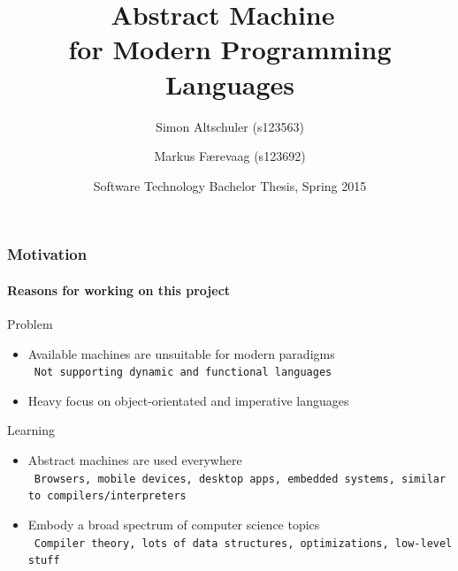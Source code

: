 \documentclass[handout]{beamer}
\title{Abstract Machine~\\for Modern Programming Languages}
\author[Altschuler, Færevaag]{Simon Altschuler (s123563) \and Markus Færevaag (s123692)}
\date{Software Technology Bachelor Thesis, Spring 2015}
\newcommand{\n}[1]{\leavevmode\\~\texttt{\color{red}\tiny #1}}
\begin{document}
\frame{\titlepage}

\begin{frame}
  \frametitle{Motivation}
  \framesubtitle{Reasons for working on this project}

  Problem
  \begin{itemize}
  \item Available machines are unsuitable for modern paradigms
    \n{Not supporting dynamic and functional languages}
  \item Heavy focus on object-orientated and imperative languages
  \end{itemize}

  \pause{}

  \vspace{20pt}
  Learning
  \begin{itemize}
  \item Abstract machines are used everywhere
    \n{Browsers, mobile devices, desktop apps, embedded systems, similar to compilers/interpreters}
  \item Embody a broad spectrum of computer science topics
    \n{Compiler theory, lots of data structures, optimizations, low-level stuff}
  \end{itemize}

\end{frame}
\end{document}
